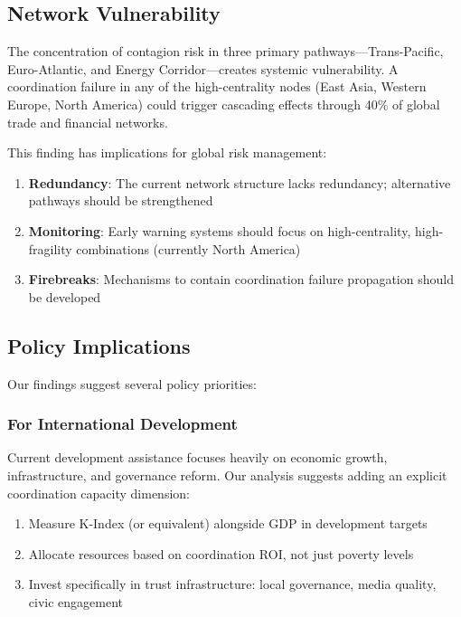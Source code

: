 \documentclass[12pt,a4paper]{article}
\begin{document}
\subsection{Network Vulnerability}

The concentration of contagion risk in three primary pathways---Trans-Pacific, Euro-Atlantic, and Energy Corridor---creates systemic vulnerability. A coordination failure in any of the high-centrality nodes (East Asia, Western Europe, North America) could trigger cascading effects through 40\% of global trade and financial networks.

This finding has implications for global risk management:

\begin{enumerate}
    \item \textbf{Redundancy}: The current network structure lacks redundancy; alternative pathways should be strengthened
    \item \textbf{Monitoring}: Early warning systems should focus on high-centrality, high-fragility combinations (currently North America)
    \item \textbf{Firebreaks}: Mechanisms to contain coordination failure propagation should be developed
\end{enumerate}

\subsection{Policy Implications}

Our findings suggest several policy priorities:

\subsubsection{For International Development}

Current development assistance focuses heavily on economic growth, infrastructure, and governance reform. Our analysis suggests adding an explicit coordination capacity dimension:

\begin{enumerate}
    \item Measure K-Index (or equivalent) alongside GDP in development targets
    \item Allocate resources based on coordination ROI, not just poverty levels
    \item Invest specifically in trust infrastructure: local governance, media quality, civic engagement
\end{enumerate}
\end{document}
